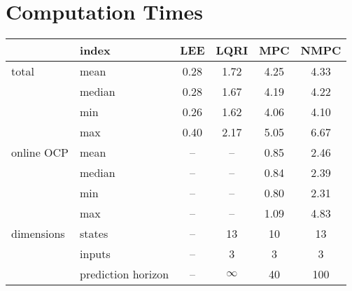 \ETHslide
\section*{Computation Times}
\vspace*{\fill}

\begin{table}[h!]
\begin{center}
\small{
\begin{tabular}{ll|cccc}
\hline
      & index  & LEE        & LQRI       & MPC        & NMPC       \\ \hline \hline
total & mean   & \num{0.28} & \num{1.72} & \num{4.25} & \num{4.33} \\
      & median & \num{0.28} & \num{1.67} & \num{4.19} & \num{4.22} \\
      & min    & \num{0.26} & \num{1.62} & \num{4.06} & \num{4.10} \\
      & max    & \num{0.40} & \num{2.17} & \num{5.05} & \num{6.67} \\
\hline
online OCP & mean   & -- & -- & \num{0.85} & \num{2.46}\\
           & median & -- & -- & \num{0.84} & \num{2.39}\\
           & min    & -- & -- & \num{0.80} & \num{2.31}\\
           & max    & -- & -- & \num{1.09} & \num{4.83}\\
\hline
dimensions & states & -- & 13 & 10 & 13 \\
 		   & inputs & -- & 3  & 3  & 3  \\
 		   & prediction horizon & -- & $\infty$ & \num{40} & \num{100} \\
\hline
\end{tabular}
}
\end{center}
\end{table}

\vspace*{\fill}
\clearpage